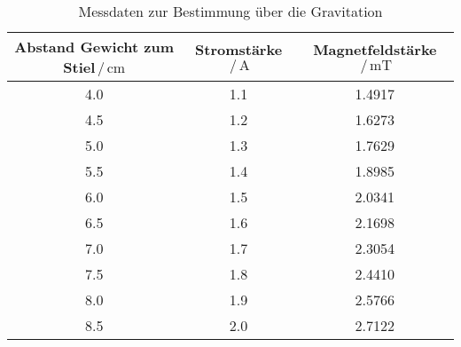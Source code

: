 \begin{table}[h]
    \centering
    
    
    \begin{tabular}{c c c}
      Abstand Gewicht zum Stiel$\,/\,\si{\centi\meter}$ & Stromstärke$\,/\,\si{\ampere}$ & Magnetfeldstärke$\,/\,\si{\milli\tesla}$ \\
      \toprule
          4.0 & 1.1 & 1.4917\\
          4.5 & 1.2 & 1.6273\\
          5.0 & 1.3 & 1.7629\\
          5.5 & 1.4 & 1.8985\\
          6.0 & 1.5 & 2.0341\\
          6.5 & 1.6 & 2.1698\\
          7.0 & 1.7 & 2.3054\\
          7.5 & 1.8 & 2.4410\\
          8.0 & 1.9 & 2.5766\\
          8.5 & 2.0 & 2.7122\\
      \bottomrule
    \end{tabular}
    \caption{Messdaten zur Bestimmung über die Gravitation}
    \label{tab:some_data1}
  \end{table}